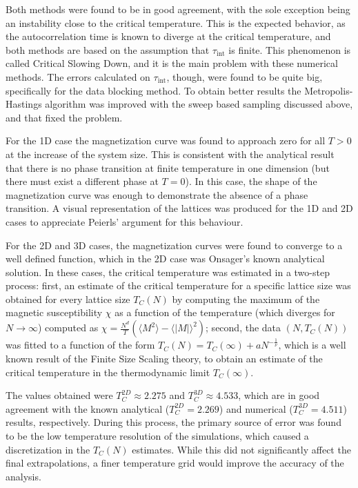 \documentclass[11pt,a4paper]{article}
\begin{document}
Both methods were found to be in good agreement, with the sole exception being an instability close to the critical temperature. This is the expected behavior, as the autocorrelation time is known to diverge at the critical temperature, and both methods are based on the assumption that $\tau_{\text{int}}$ is finite. This phenomenon is called Critical Slowing Down, and it is the main problem with these numerical methods. The errors calculated on $\tau_{\text{int}}$, though, were found to be quite big, specifically for the data blocking method. To obtain better results the Metropolis-Hastings algorithm was improved with the sweep based sampling discussed above, and that fixed the problem.

For the 1D case the magnetization curve was found to approach zero for all $T > 0$ at the increase of the system size. This is consistent with the analytical result that there is no phase transition at finite temperature in one dimension (but there must exist a different phase at $T = 0$). In this case, the shape of the magnetization curve was enough to demonstrate the absence of a phase transition. A visual representation of the lattices was produced for the 1D and 2D cases to appreciate Peierls' argument for this behaviour.

For the 2D and 3D cases, the magnetization curves were found to converge to a well defined function, which in the 2D case was Onsager's known analytical solution. In these cases, the critical temperature was estimated in a two-step process: first, an estimate of the critical temperature for a specific lattice size was obtained for every lattice size $T_C(N)$ by computing the maximum of the magnetic susceptibility $\chi$ as a function of the temperature (which diverges for $N \to \infty$) computed as $\chi = \frac{N^d}{T} \left( \langle M^2 \rangle - \langle |M| \rangle^2 \right)$; second, the data $(N, T_C(N))$ was fitted to a function of the form $T_C(N) = T_C(\infty) + aN^{-\frac{1}{\nu}}$, which is a well known result of the Finite Size Scaling theory, to obtain an estimate of the critical temperature in the thermodynamic limit $T_C(\infty)$.

The values obtained were $T_C^{2D} \approx 2.275$ and $T_C^{3D} \approx 4.533$, which are in good agreement with the known analytical ($T_C^{2D} = 2.269$) and numerical ($T_C^{3D} = 4.511$) results, respectively. During this process, the primary source of error was found to be the low temperature resolution of the simulations, which caused a discretization in the $T_C(N)$ estimates. While this did not significantly affect the final extrapolations, a finer temperature grid would improve the accuracy of the analysis.
\end{document}

